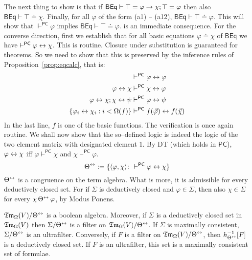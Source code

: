 The next thing to show is that if $\mathsf{BEq} \vdash 
\top = \varphi \rightarrow \chi; \top = \varphi$ then also 
$\mathsf{BEq} \vdash \top \doteq \chi$. Finally, for all 
$\varphi$ of the form (a1) -- (a12), $\mathsf{BEq} \vdash 
\top \doteq \varphi$. This will show that $\vdash^{\mathsf{PC}} 
\varphi$ implies $\mathsf{BEq} \vdash \top \doteq \varphi$. 
 is an immediate consequence. For the converse direction, 
first we establish that for all basic equations $\varphi \doteq 
\chi$ of $\mathsf{BEq}$ we have $\vdash^{\mathsf{PC}} \varphi 
\leftrightarrow \chi$. This is routine. Closure under substitution is 
guaranteed for theorems. So we need to show that this is 
preserved by the inference rules of Proposition~\ref{prop:eqcalc}, 
that is: 
\begin{subequations}
\begin{align}
& \vdash^{\mathsf{PC}} \varphi \leftrightarrow \varphi \\
\varphi \leftrightarrow \chi & \vdash^{\mathsf{PC}} \chi \leftrightarrow \varphi \\
\varphi \leftrightarrow \chi; \chi \leftrightarrow \psi & \vdash^{\mathsf{PC}} 
\varphi \leftrightarrow \psi \\
\{\varphi_i \leftrightarrow \chi_i : i < \Omega(f)\} & 
	\vdash^{\mathsf{PC}} f(\vec{\varphi}) \leftrightarrow f(\vec{\chi}) 
\end{align}
\end{subequations}
In the last line, $f$ is one of the basic functions. The verification 
is once again routine. We shall now show that the so--defined logic is 
indeed the logic of the two element matrix with designated element 1. 
By DT (which holds in $\mathsf{PC}$), $\varphi \leftrightarrow \chi$ iff $\varphi 
\vdash^{\mathsf{PC}} \chi$ and $\chi \vdash^{\mathsf{PC}} \varphi$. 
\index{$\Theta^{\dpf}$}%
\begin{equation}
\Theta^{\leftrightarrow} := \{\langle \varphi, \chi\rangle \colon \vdash^{\mathsf{PC}}
\varphi \leftrightarrow \chi\}
\end{equation}
$\Theta^{\dpf}$ is a congruence on the term algebra. What is 
more, it is admissible for every deductively closed set. For if 
$\Sigma$ is deductively closed and $\varphi \in \Sigma$, then 
also $\chi \in \Sigma$ for every $\chi \, \Theta^{\leftrightarrow}\, \varphi$, 
by Modus Ponens.
\begin{lem}
$\mathfrak{Tm}_{\Omega}(V)/\Theta^{\leftrightarrow}$ is a boolean algebra. Moreover, if
$\Sigma$ is a deductively closed set in $\mathfrak{Tm}_{\Omega}(V)$
then $\Sigma/\Theta^{\leftrightarrow}$ is a filter on 
$\mathfrak{Tm}_{\Omega}(V)/\Theta^{\leftrightarrow}$. If $\Sigma$ is maximally 
consistent, $\Sigma/\Theta^{\leftrightarrow}$ is an
ultrafilter. Conversely, if $F$ is a filter on 
$\mathfrak{Tm}_{\Omega}(V)/\Theta^{\leftrightarrow}$, then $h^{-1}_{\Theta^{\leftrightarrow}}[F]$
is a deductively closed set. If $F$ is an ultrafilter, this set is a
maximally consistent set of formulae.
\end{lem}
